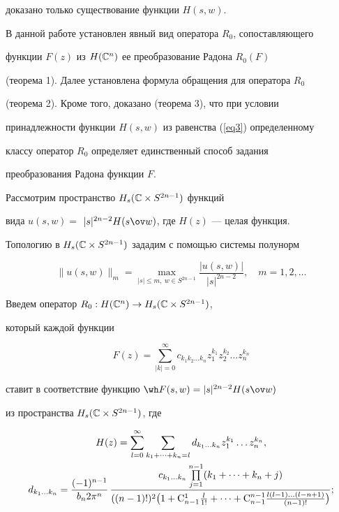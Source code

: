 доказано только существование функции $H(s,w)$.





В данной работе установлен явный вид оператора $R_0$, сопоставляющего 


функции $F(z)$ из $H(\Bbb C^n)$ ее преобразование Радона $R_0(F)$


(теорема 1). Далее установлена формула обращения для оператора $R_0$


(теорема 2). Кроме того, доказано (теорема 3), что при условии 


принадлежности функции $H(s,w)$ из равенства (\ref{eq3}) определенному 


классу оператор $R_0$ определяет единственный способ задания 


преобразования Радона функции $F$.





Рассмотрим пространство $H_s(\Bbb C\times S^{2n-1})$ функций 


вида $u(s,w)=$ $|s|^{2n-2}H(s\ov w)$, где $ H(z)$ --- целая функция. 


Топологию в $H_s(\Bbb C\times S^{2n-1})$ зададим с помощью системы полунорм


$$


\|u(s,w)\|_m=\max_{|s|\leq m,\ w \in S^{2n-1}}


\frac{|u(s,w)|}{|s|^{2n-2}},\quad m=1,2,\dotsc


$$





Введем оператор $R_0:H(\Bbb C^n)\to H_s(\Bbb C\times S^{2n-1})$, 


который каждой функции 


\begin{equation} \label{eq4}


F(z)=\sum_{|k|=0}^{\infty }c_{k_1k_2\dotsc k_n}


z_1^{k_1}z_2^{k_2}\dotsc z_n^{k_n}


\end{equation}


ставит в соответствие функцию $\wh F(s,w)=|s|^{2n-2} H(s\ov w)$


из пространства $H_s(\Bbb C \times S^{2n-1})$, где


\begin{gather} \label{eq5}


H(z)=\sum_{l=0}^{\infty }\sum_{k_1+\dotsb+k_n=l}


d_{k_1\dotsc k_n}z_1^{k_1}\dotsc z_n^{k_n},\\


%


d_{k_1\dotsc k_n}=\frac{(-1)^{n-1}}{b_n2\pi^n}\,


\frac{c_{k_1\dotsc k_n}\prod\limits_{j=1}^{n-1}(k_1+\dotsb +k_n+j)}


{((n-1)!)^2\big(1+\mathrm C^1_{n-1}\frac{l}{1!}+\dotsb


+\mathrm C^{n-1}_{n-1}\frac{l(l-1)\dotsc(l-n+1)}{(n-1)!}\big)};\notag


\end{gather}


